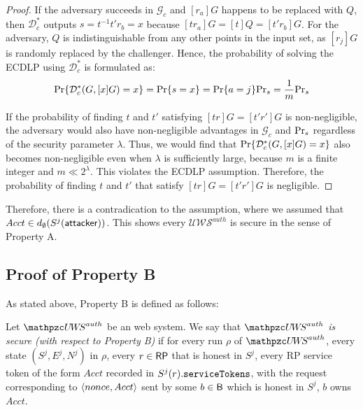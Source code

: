 \begin{proof}
    If the adversary succeeds in $\mathcal{G}_c$ and $[r_a]G$ happens to be replaced with $Q$, 
    then $\mathcal{D}^*_c$ outputs $s=t^{-1}t'r_b =x$ because $[tr_a]G = [t]Q = [t'r_b]G$. 
    For the adversary, $Q$ is indistinguishable from any other points in the input set, 
    as $[r_j]G$ is randomly replaced by the challenger.
    Hence, the probability of solving the ECDLP using $\mathcal{D}^*_c$ is formulated as:
    \begin{equation*}
      {\rm Pr}\{\mathcal{D}^*_c(G, [x]G)=x\} = {\rm Pr}\{s = x\}={\rm Pr}\{a=j\}{\rm Pr}_s=\frac{1}{m}{\rm Pr}_s
    \end{equation*}
  
    If the probability of finding $t$ and $t'$ satisfying $[tr]G = [t'r']G$ is non-negligible, 
    the adversary would also have non-negligible advantages in $\mathcal{G}_c$ and ${\rm Pr}_s$ regardless of the security parameter $\lambda$.
    Thus, we would find that ${\rm Pr}\{\mathcal{D}^*_c(G, [x]G)=x\}$ also becomes non-negligible even when $\lambda$ is sufficiently large, 
    because $m$ is a finite integer and $m \ll 2^\lambda$.
    This violates the ECDLP assumption. 
    Therefore, the probability of finding $t$ and $t'$ that satisfy $[tr]G = [t'r']G$ is negligible.
  \end{proof}
  
  Therefore, there is a contradication to the assumption, where we assumed that 
  $Acct \in d_{\emptyset}(S^j(\mathsf{attacker}))$. 
  This shows every $\mathcal{U\!W\!S}^{auth}$ is secure in the sense of Property A.
  
  \subsection{Proof of Property B}
  As stated above, Property B is defined as follows:
  \begin{definition}\label{def:B}
    Let $\uppressoauthwebsystem$ be an \uppresso web system. We say that
    \emph{$\uppressoauthwebsystem$ is secure (with respect to Property B)} if
    for every run $\rho$ of $\uppressoauthwebsystem$, every state $(S^j, E^j, N^j)$
    in $\rho$, every $r\in \mathsf{RP}$ that is honest in $S^j$, 
    every RP service token of the form $Acct$ recorded in
    $S^j(r).\mathtt{serviceTokens}$, with the request corresponding to
    $\langle {{}nonce, Acct} \rangle$ sent by some $b\in \mathsf{B}$ which is honest in $S^j$, $b$ owns $Acct$.
  \end{definition}
  
